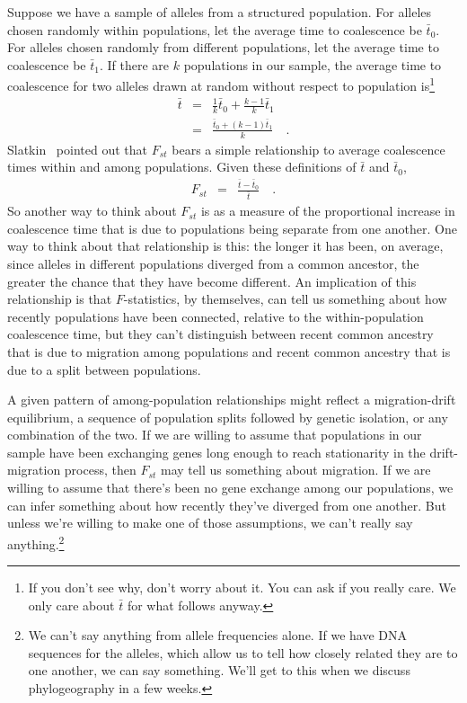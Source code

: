 Suppose we have a sample of alleles from a structured population. For
alleles chosen randomly within populations, let the average time to
coalescence be $\bar t_0$. For alleles chosen randomly from different
populations, let the average time to coalescence be $\bar t_1$. If
there are $k$ populations in our sample, the average time to
coalescence for two alleles drawn at random without respect to
population is\footnote{If you don't see why, don't worry about it. You
can ask if you really care. We only care about $\bar t$ for what
follows anyway.}
\begin{eqnarray*}
  \bar t &=& \frac{1}{k}\bar t_0 + \frac{k-1}{k}\bar t_1 \\
  &=& \frac{\bar t_0 + (k-1)\bar t_1}
              {k} \quad .
\end{eqnarray*}
Slatkin~\cite{Slatkin-1991} pointed out that $F_{st}$ bears a simple
relationship to average coalescence times within and among
populations. Given these definitions of $\bar t$ and $\bar t_0$,
\begin{eqnarray*}
  F_{st} &=& \frac{\bar t - \bar t_0}{\bar t} \quad .
\end{eqnarray*}
So another way to think about $F_{st}$ is as a measure of the
proportional increase in coalescence time that is due to populations
being separate from one another. One way to think about that
relationship is this: the longer it has been, on average, since
alleles in different populations diverged from a common ancestor, the
greater the chance that they have become different. An implication of
this relationship is that $F$-statistics, by themselves, can tell us
something about how recently populations have been connected, relative
to the within-population coalescence time, but they can't distinguish
between recent common ancestry that is due to migration among
populations and recent common ancestry that is due to a split between
populations.

A given pattern of among-population relationships might reflect a
migration-drift equilibrium, a sequence of population splits followed
by genetic isolation, or any combination of the two. If we are willing
to assume that populations in our sample have been exchanging genes
long enough to reach stationarity in the drift-migration process, then
$F_{st}$ may tell us something about migration. If we are willing to
assume that there's been no gene exchange among our populations, we
can infer something about how recently they've diverged from one
another. But unless we're willing to make one of those assumptions, we
can't really say anything.\footnote{We can't say anything from allele
  frequencies alone. If we have DNA sequences for the alleles, which
  allow us to tell how closely related they are to one another, we
  can say something. We'll get to this when we discuss phylogeography
  in a few weeks.}

